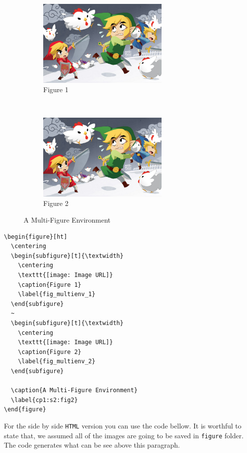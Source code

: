\documentclass[12pt]{report}
\numberwithin{equation}{section}
\theoremstyle{definition}
\theoremstyle{remark}
\theoremstyle{example}
\theoremstyle{axiom}
\begin{document}
\begin{figure}[ht]
	\centering
	\begin{subfigure}[t]{\textwidth}
		\centering
		\includegraphics[width=0.7\textwidth]{figures/Sample/tumblr_static_eaceks0rfxsss8o4swscw40wo.jpg}
		\caption{Figure 1}
		\label{fig_multienv_1}
	\end{subfigure}
	~
	\begin{subfigure}[t]{\textwidth}
		\centering
		\includegraphics[width=0.7\textwidth]{figures/Sample/tumblr_static_eaceks0rfxsss8o4swscw40wo.jpg}
		\caption{Figure 2}
		\label{fig_multienv_2}
	\end{subfigure}
	
	\caption{A Multi-Figure Environment}
	\label{cp1:s2:fig2}
\end{figure}
\begin{verbatim}
\begin{figure}[ht]
  \centering
  \begin{subfigure}[t]{\textwidth}
    \centering
    \texttt{[image: Image URL]}
    \caption{Figure 1}
    \label{fig_multienv_1}
  \end{subfigure}
  ~
  \begin{subfigure}[t]{\textwidth}
    \centering
    \texttt{[image: Image URL]}
    \caption{Figure 2}
    \label{fig_multienv_2}
  \end{subfigure}

  \caption{A Multi-Figure Environment}
  \label{cp1:s2:fig2}
\end{figure}
\end{verbatim}
For the side by side  \texttt{HTML} version you can use the code bellow. It is
worthful to state that, we assumed all of the images are going to be saved in
\texttt{figure} folder. The code generates what can be see above this paragraph.
\end{document}
